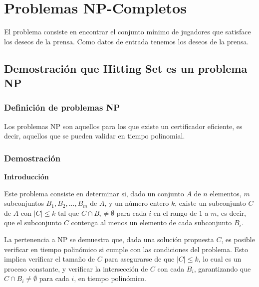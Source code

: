 \documentclass{estilo}
\begin{document}
\maketitle

\justifying{
}

% 
\newpage

\section{Problemas NP-Completos}

El problema consiste en encontrar el conjunto mínimo de jugadores que satisface los deseos de la prensa. Como datos de entrada tenemos los deseos de la prensa.


\subsection{Demostración que Hitting Set es un problema NP}

\subsubsection{Definición de problemas NP}
Los problemas NP son aquellos para los que existe un certificador eficiente, es decir, aquellos que se pueden validar en tiempo polinomial.

\subsubsection{Demostración}

\textbf{Introducción}

\hspace{0.5cm} Este problema consiste en determinar si, dado un conjunto \(A\) de \(n\) elementos, \(m\) subconjuntos \(B_1, B_2, ..., B_m\) de \(A\), y un número entero \(k\), existe un subconjunto \(C\) de \(A\) con \(|C| \leq k\) tal que \(C \cap B_i \neq \emptyset\) para cada \(i\) en el rango de \(1\) a \(m\), es decir, que el subconjunto $C$ contenga al menos un elemento de cada subconjunto $B_i$.

\hspace{0.5cm} La pertenencia a NP se demuestra que, dada una solución propuesta \(C\), es posible verificar en tiempo polinómico si cumple con las condiciones del problema. Esto implica verificar el tamaño de \(C\) para asegurarse de que \(|C| \leq k\), lo cual es un proceso constante, y verificar la intersección de \(C\) con cada \(B_i\), garantizando que \(C \cap B_i \neq \emptyset\) para cada \(i\), en tiempo polinómico.
\end{document}
